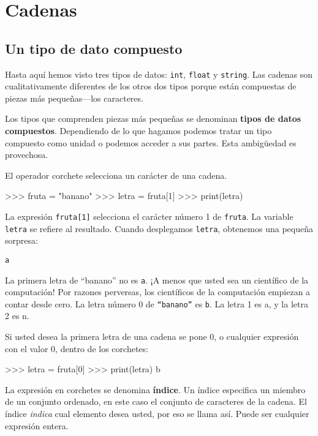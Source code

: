 
\chapter{Cadenas }

\label{strings}

\section{Un tipo de dato compuesto}

 

Hasta aquí hemos visto tres tipos de datos: \texttt{int}, \texttt{float}
y \texttt{string}. Las cadenas son cualitativamente diferentes de
los otros dos tipos porque están compuestas de piezas más pequeñas—los
caracteres.


Los tipos que comprenden piezas más pequeñas se denominan \textbf{tipos
de datos compuestos}. Dependiendo de lo que hagamos podemos tratar
un tipo compuesto como unidad o podemos acceder a sus partes. Esta
ambigüedad es provechosa.

 

El operador corchete selecciona un carácter de una cadena.

\begin{pyconcode}
>>> fruta = "banano"
>>> letra = fruta[1]
>>> print(letra)	
\end{pyconcode}

La expresión \texttt{fruta{[}1{]}} selecciona el carácter número 1
de \texttt{fruta}. La variable \texttt{letra} se refiere al resultado.
Cuando desplegamos \texttt{letra}, obtenemos una pequeña sorpresa:
\begin{verbatim}
a
\end{verbatim}
La primera letra de ``banano'' no es \texttt{a}. ¡A menos que usted
sea un científico de la computación! Por razones perversas, los científicos
de la computación empiezan a contar desde cero. La letra número 0
de \texttt{``banano''} es \texttt{b}. La letra 1 es a, y la letra
2 es n.

Si usted desea la primera letra de una cadena se pone 0, o cualquier
expresión con el valor 0, dentro de los corchetes:
\begin{pyconcode}
>>> letra = fruta[0]
>>> print(letra)
b
\end{pyconcode}

La expresión en corchetes se denomina \textbf{índice}. Un índice especifica
un miembro de un conjunto ordenado, en este caso el conjunto de caracteres
de la cadena. El índice {\em indica} cual elemento desea usted,
por eso se llama así. Puede ser cualquier expresión entera.

